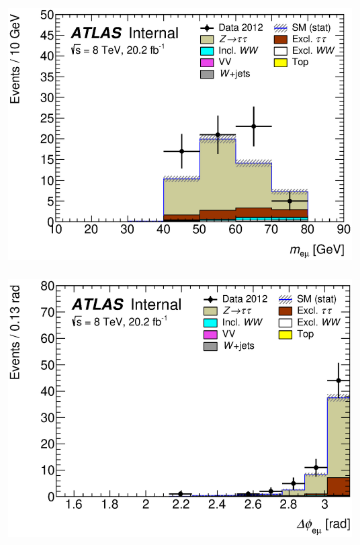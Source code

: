 \begin{figure}[!h]
\begin{subfigure}{0.5\textwidth}
   \includegraphics[width=\textwidth]{figures/emme-CutTopoMll-Mll_ztau-lin.eps}
\end{subfigure}
\begin{subfigure}{0.5\textwidth}
   \includegraphics[width=\textwidth]{figures/emme-CutTopoMll-DPhill_ztau-lin.eps}
\end{subfigure} 
\begin{subfigure}{0.5\textwidth}

\end{subfigure}
\end{figure}
